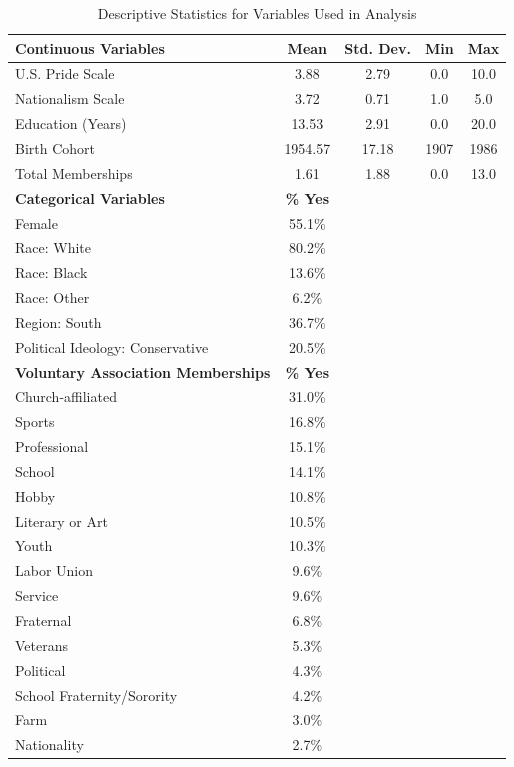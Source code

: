 \documentclass[12pt,letterpaper]{article}
\begin{document}
\newpage


\begin{table}[htbp]
\centering
\caption{Descriptive Statistics for Variables Used in Analysis}
\label{tab:descriptives}
\begin{tabular}{lcccc}
\toprule
\textbf{Continuous Variables} & \textbf{Mean} & \textbf{Std. Dev.} & \textbf{Min} & \textbf{Max} \\
\midrule
U.S. Pride Scale & 3.88 & 2.79 & 0.0 & 10.0 \\
Nationalism Scale & 3.72 & 0.71 & 1.0 & 5.0 \\
Education (Years) & 13.53 & 2.91 & 0.0 & 20.0 \\
Birth Cohort & 1954.57 & 17.18 & 1907 & 1986 \\
Total Memberships & 1.61 & 1.88 & 0.0 & 13.0 \\
\midrule
\textbf{Categorical Variables} & \textbf{\% Yes} & & & \\
\midrule
Female & 55.1\% & & & \\
Race: White & 80.2\% & & & \\
Race: Black & 13.6\% & & & \\
Race: Other & 6.2\% & & & \\
Region: South & 36.7\% & & & \\
Political Ideology: Conservative & 20.5\% & & & \\
\midrule
\textbf{Voluntary Association Memberships} & \textbf{\% Yes} & & & \\
\midrule
Church-affiliated & 31.0\% & & & \\
Sports & 16.8\% & & & \\
Professional & 15.1\% & & & \\
School & 14.1\% & & & \\
Hobby & 10.8\% & & & \\
Literary or Art & 10.5\% & & & \\
Youth & 10.3\% & & & \\
Labor Union & 9.6\% & & & \\
Service & 9.6\% & & & \\
Fraternal & 6.8\% & & & \\
Veterans & 5.3\% & & & \\
Political & 4.3\% & & & \\
School Fraternity/Sorority & 4.2\% & & & \\
Farm & 3.0\% & & & \\
Nationality & 2.7\% & & & \\
\bottomrule
\end{tabular}
\end{table}
\end{document}
